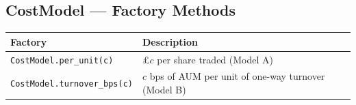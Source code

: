 \documentclass[11pt,a4paper]{article}
\begin{document}
\subsection{CostModel — Factory Methods}

\begin{center}
\begin{tabular}{@{}p{5.5cm}p{8.5cm}@{}}
\toprule
Factory & Description \\
\midrule
\texttt{CostModel.per\_unit(c)} & £$c$ per share traded (Model A) \\
\texttt{CostModel.turnover\_bps(c)} & $c$ bps of AUM per unit of one-way turnover (Model B) \\
\bottomrule
\end{tabular}
\end{center}
\end{document}
